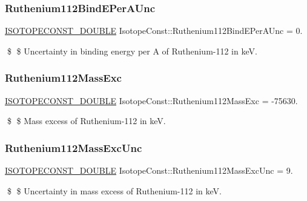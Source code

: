 \subsubsection{\texorpdfstring{Ruthenium112\+Bind\+E\+Per\+A\+Unc}{Ruthenium112BindEPerAUnc}}
{\footnotesize\ttfamily \mbox{\hyperlink{group___isotope_const-_macros_ga8f45a7272ce02c0b4c65c44636ed719a}{I\+S\+O\+T\+O\+P\+E\+C\+O\+N\+S\+T\+\_\+\+D\+O\+U\+B\+LE}} Isotope\+Const\+::\+Ruthenium112\+Bind\+E\+Per\+A\+Unc = 0.}

\$ \$ Uncertainty in binding energy per A of Ruthenium-\/112 in keV. \mbox{\label{group___isotope_const-_ruthenium-_ru112_gaf734c1458d099d23d11a79b24833a65f}} 
\subsubsection{\texorpdfstring{Ruthenium112\+Mass\+Exc}{Ruthenium112MassExc}}
{\footnotesize\ttfamily \mbox{\hyperlink{group___isotope_const-_macros_ga8f45a7272ce02c0b4c65c44636ed719a}{I\+S\+O\+T\+O\+P\+E\+C\+O\+N\+S\+T\+\_\+\+D\+O\+U\+B\+LE}} Isotope\+Const\+::\+Ruthenium112\+Mass\+Exc = -\/75630.}

\$ \$ Mass excess of Ruthenium-\/112 in keV. \mbox{\label{group___isotope_const-_ruthenium-_ru112_ga01183dcb684fdd9ce1309ff0c1787731}} 
\subsubsection{\texorpdfstring{Ruthenium112\+Mass\+Exc\+Unc}{Ruthenium112MassExcUnc}}
{\footnotesize\ttfamily \mbox{\hyperlink{group___isotope_const-_macros_ga8f45a7272ce02c0b4c65c44636ed719a}{I\+S\+O\+T\+O\+P\+E\+C\+O\+N\+S\+T\+\_\+\+D\+O\+U\+B\+LE}} Isotope\+Const\+::\+Ruthenium112\+Mass\+Exc\+Unc = 9.}

\$ \$ Uncertainty in mass excess of Ruthenium-\/112 in keV. \mbox{\label{group___isotope_const-_ruthenium-_ru112_gaf265aeeab807ecfd91493f317334d1f1}} 

